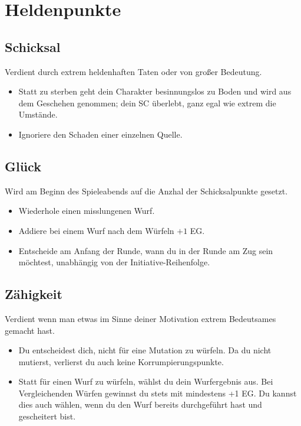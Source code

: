 \documentclass[a4paper, fontsize=10pt twocolumn]{scrartcl}
\begin{document}
\section{Heldenpunkte}
\begin{multicols}{2}
    \subsection{Schicksal}
    Verdient durch extrem heldenhaften Taten oder von großer Bedeutung.
    \begin{itemize}
        \item Statt zu sterben geht dein Charakter besinnungslos zu Boden und wird aus dem Geschehen genommen; dein SC überlebt, ganz egal wie extrem die Umstände.
        \item Ignoriere den Schaden einer einzelnen Quelle.
    \end{itemize}

    \subsection{Glück}
    Wird am Beginn des Spieleabends auf die Anzhal der Schicksalpunkte gesetzt.
    \begin{itemize}
        \item Wiederhole einen misslungenen Wurf.
        \item Addiere bei einem Wurf nach dem Würfeln $+1$ EG.
        \item Entscheide am Anfang der Runde, wann du in der Runde am Zug sein möchtest, unabhängig von der Initiative-Reihenfolge.
    \end{itemize}

    \vfill\null
    \columnbreak

    \subsection{Zähigkeit}
    Verdient wenn man etwas im Sinne deiner Motivation extrem Bedeutsames gemacht hast.
    \begin{itemize}
        \item Du entscheidest dich, nicht für eine Mutation zu würfeln. Da du nicht mutierst, verlierst du auch keine Korrumpierungspunkte.
        \item  Statt für einen Wurf zu würfeln, wählst du dein Wurfergebnis aus. Bei Vergleichenden Würfen gewinnst du stets mit mindestens +1 EG. Du kannst dies auch wählen, wenn du den Wurf bereits durchgeführt hast und gescheitert bist.
    \end{itemize}


\end{multicols}
\end{document}
